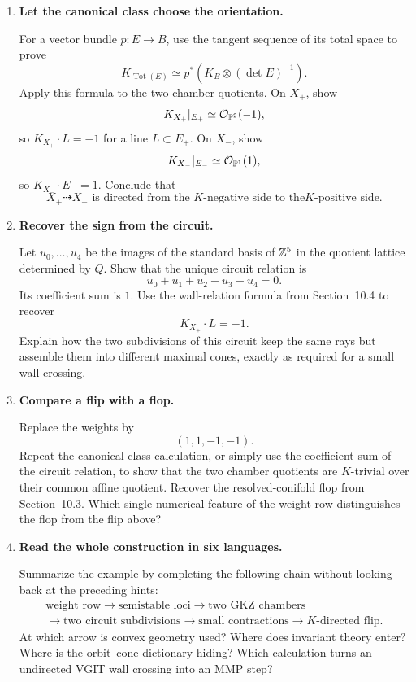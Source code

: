 \begin{enumerate}[label=\textbf{Hint \arabic*.},wide=0pt]
\item \textbf{Let the canonical class choose the orientation.}

For a vector bundle \(p:E\to B\), use the tangent sequence of its
total space to prove
\[
K_{\operatorname{Tot}(E)}
\simeq
p^*\!\left(K_B\otimes(\det E)^{-1}\right).
\]
Apply this formula to the two chamber quotients.  On \(X_+\), show
\[
K_{X_+}|_{E_+}
\simeq
\mathcal O_{\mathbb{P}^2}(-1),
\]
so \(K_{X_+}\cdot L=-1\) for a line
\(L\subset E_+\).  On \(X_-\), show
\[
K_{X_-}|_{E_-}
\simeq
\mathcal O_{\mathbb{P}^1}(1),
\]
so \(K_{X_-}\cdot E_-=1\).  Conclude that
\[
\boxed{
X_+\dashrightarrow X_-
\text{ is directed from the \(K\)-negative side to the
\(K\)-positive side}.}
\]

\item \textbf{Recover the sign from the circuit.}

Let \(u_0,\ldots,u_4\) be the images of the standard basis of
\(\mathbb{Z}^5\) in the quotient lattice determined by \(Q\).  Show that the
unique circuit relation is
\[
u_0+u_1+u_2-u_3-u_4=0.
\]
Its coefficient sum is \(1\).  Use the wall-relation formula from
Section~10.4 to recover
\[
K_{X_+}\cdot L=-1.
\]
Explain how the two subdivisions of this circuit keep the same rays
but assemble them into different maximal cones, exactly as required
for a small wall crossing.

\item \textbf{Compare a flip with a flop.}

Replace the weights by
\[
(1,1,-1,-1).
\]
Repeat the canonical-class calculation, or simply use the coefficient
sum of the circuit relation, to show that the two chamber quotients
are \(K\)-trivial over their common affine quotient.  Recover the
resolved-conifold flop from Section~10.3.  Which single numerical
feature of the weight row distinguishes the flop from the flip above?

\item \textbf{Read the whole construction in six languages.}

Summarize the example by completing the following chain without
looking back at the preceding hints:
\[
\boxed{
\begin{gathered}
\text{weight row}
\longrightarrow
\text{semistable loci}
\longrightarrow
\text{two GKZ chambers}
\\[-1mm]
\longrightarrow
\text{two circuit subdivisions}
\longrightarrow
\text{small contractions}
\longrightarrow
\text{\(K\)-directed flip}.
\end{gathered}}
\]
At which arrow is convex geometry used?  Where does invariant theory
enter?  Where is the orbit--cone dictionary hiding?  Which calculation
turns an undirected VGIT wall crossing into an MMP step?

\end{enumerate}

